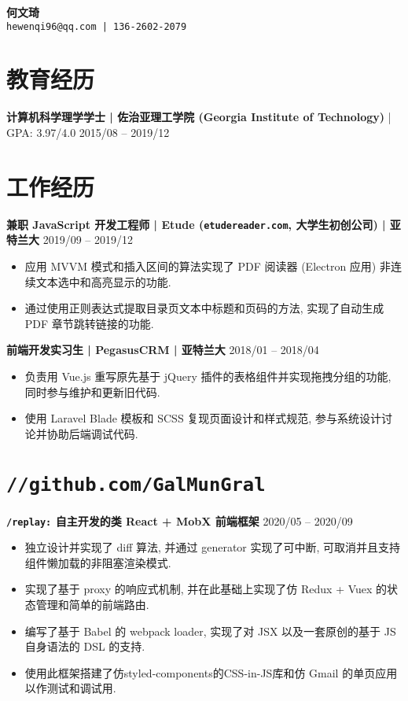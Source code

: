 \documentclass[10 pt]{article}
\begin{document}
\begin{center}
\textbf{\huge 何文琦}\\
\vspace{0.5em}
\texttt{hewenqi96@qq.com | 136-2602-2079 }
\end{center}

\section*{教育经历}
\textbf{计算机科学理学学士 | 佐治亚理工学院 (Georgia Institute of Technology)} | GPA: 3.97/4.0 \hfill 2015/08 -- 2019/12

\section*{工作经历}
\textbf{兼职 JavaScript 开发工程师 | Etude (\texttt{etudereader.com}, 大学生初创公司) | 亚特兰大} \hfill 2019/09 -- 2019/12
\begin{itemize}
\item 应用 MVVM 模式和插入区间的算法实现了 PDF 阅读器 (Electron 应用) 非连续文本选中和高亮显示的功能.
\item 通过使用正则表达式提取目录页文本中标题和页码的方法, 实现了自动生成 PDF 章节跳转链接的功能.
\end{itemize}

\textbf{前端开发实习生 | PegasusCRM | 亚特兰大} \hfill 2018/01 -- 2018/04
\begin{itemize}
\item 负责用 Vue.js 重写原先基于 jQuery 插件的表格组件并实现拖拽分组的功能, 同时参与维护和更新旧代码.
\item 使用 Laravel Blade 模板和 SCSS 复现页面设计和样式规范, 参与系统设计讨论并协助后端调试代码.
\end{itemize} 


\section*{\texttt{\large //github.com/GalMunGral}}
\textbf{ \texttt{/replay:} 自主开发的类 React + MobX  前端框架} \hfill 2020/05 -- 2020/09
\begin{itemize}
\item 独立设计并实现了 diff 算法, 并通过 generator 实现了可中断, 可取消并且支持组件懒加载的非阻塞渲染模式.
\item 实现了基于 proxy 的响应式机制, 并在此基础上实现了仿 Redux + Vuex 的状态管理和简单的前端路由.
\item 编写了基于 Babel 的 webpack loader, 实现了对 JSX 以及一套原创的基于 JS 自身语法的 DSL 的支持.
\item 使用此框架搭建了仿styled-components的CSS-in-JS库和仿 Gmail 的单页应用以作测试和调试用.
\end{itemize}
\end{document}
